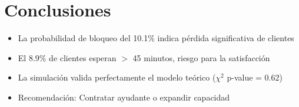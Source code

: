 \documentclass{article}
\begin{document}
\section{Conclusiones}
\begin{itemize}
    \item La probabilidad de bloqueo del 10.1\% indica pérdida significativa de clientes
    \item El 8.9\% de clientes esperan $>$ 45 minutos, riesgo para la satisfacción
    \item La simulación valida perfectamente el modelo teórico ($\chi^2$ p-value = 0.62)
    \item Recomendación: Contratar ayudante o expandir capacidad
\end{itemize}
\end{document}
